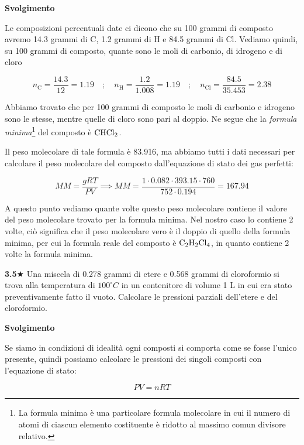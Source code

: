 \vspace{0.2cm}\large\textbf{Svolgimento}\normalsize

\vspace{0.2cm}Le composizioni percentuali date ci dicono che su 100 grammi di composto avremo 14.3 grammi di C, 1.2 grammi di H e 84.5 grammi di Cl. Vediamo quindi, su 100 grammi di composto, quante sono le moli di carbonio, di idrogeno e di cloro

$$n_{\text{C}}=\frac{14.3}{12}=1.19
\quad;\quad
n_{\text{H}}=\frac{1.2}{1.008}=1.19
\quad;\quad
n_{\text{Cl}}=\frac{84.5}{35.453}=2.38$$

Abbiamo trovato che per 100 grammi di composto le moli di carbonio e idrogeno sono le stesse, mentre quelle di cloro sono pari al doppio. Ne segue che la \textit{formula minima}\footnote{La formula minima è una particolare formula molecolare in cui il numero di atomi di ciascun elemento costituente è ridotto al massimo comun divisore relativo.} del composto è $\rm CHCl_2$.

Il peso molecolare di tale formula è 83.916, ma abbiamo tutti i dati necessari per calcolare il peso molecolare del composto dall'equazione di stato dei gas perfetti:

$$MM=\frac{gRT}{PV} \implies MM=\frac{1 \cdot 0.082 \cdot 393.15 \cdot 760}{752 \cdot 0.194}=167.94$$

A questo punto vediamo quante volte questo peso molecolare contiene il valore del peso molecolare trovato per la formula minima. Nel nostro caso lo contiene 2 volte, ciò significa che il peso molecolare vero è il doppio di quello della formula minima, per cui la formula reale del composto è $\rm C_2H_2Cl_4$, in quanto contiene 2 volte la formula minima.

\vspace{0.2cm}\textbf{3.5}$\bigstar$ Una miscela di 0.278 grammi di etere e 0.568 grammi di cloroformio si trova alla temperatura di $100^{\circ}C$ in un contenitore di volume 1 L in cui era stato preventivamente fatto il vuoto. Calcolare le pressioni parziali dell'etere e del cloroformio.

\vspace{0.2cm}\large\textbf{Svolgimento}\normalsize

\vspace{0.2cm}Se siamo in condizioni di idealità ogni composti si comporta come se fosse l'unico presente, quindi possiamo calcolare le pressioni dei singoli composti con l'equazione di stato:

$$PV=nRT$$

